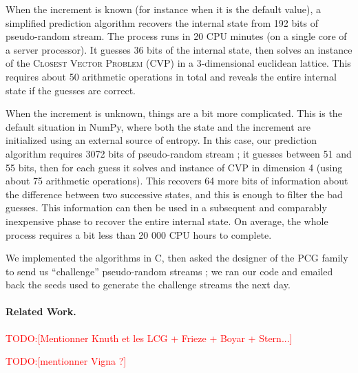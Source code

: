 \documentclass[preprint]{iacrtrans}
\newcommand{\todo}[1]{\textcolor{red}{TODO:[#1]}}
\begin{document}
When the increment is known (for instance when it is the default value), a
simplified prediction algorithm recovers the internal state from 192 bits of
pseudo-random stream. The process runs in 20 CPU minutes (on a single core of a
server processor). It guesses 36 bits of the internal state, then solves an
instance of the \textsc{Closest Vector Problem} (CVP) in a 3-dimensional
euclidean lattice. This requires about 50 arithmetic operations in total and
reveals the entire internal state if the guesses are correct.

When the increment is unknown, things are a bit more complicated. This is the
default situation in \textsf{NumPy}, where both the state and the increment are
initialized using an external source of entropy. In this case, our prediction
algorithm requires 3072 bits of pseudo-random stream ; it guesses between 51 and
55 bits, then for each guess it solves and instance of CVP in dimension 4 (using
about 75 arithmetic operations). This recovers 64 more bits of information about
the difference between two successive states, and this is enough to filter the
bad guesses. This information can then be used in a subsequent and comparably
inexpensive phase to recover the entire internal state. On average, the whole
process requires a bit less than 20 000 CPU hours to complete.

We implemented the algorithms in \textsf{C}, then asked the designer of the PCG
family to send us ``challenge'' pseudo-random streams ; we ran our code and
emailed back the seeds used to generate the challenge streams the next day.

\paragraph{Related Work.} \todo{Mentionner Knuth et les LCG + Frieze + Boyar + Stern...}

\todo{mentionner Vigna ?}


\end{document}
